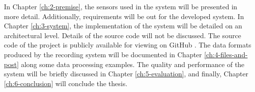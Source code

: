 In Chapter \ref{ch:2-premise}, the sensors used in the system will be presented in more detail.
Additionally, requirements will be out for the developed system.
In Chapter \ref{ch:3-system}, the implementation of the system will be detailed on an architectural level.
Details of the source code will not be discussed. The source code of the project is publicly available for viewing on GitHub \cite{github-link}.
The data formats produced by the recording system will be documented in Chapter \ref{ch:4-files-and-post} along some data processing examples.
The quality and performance of the system will be briefly discussed in Chapter \ref{ch:5-evaluation},
and finally, Chapter \ref{ch:6-conclusion} will conclude the thesis.